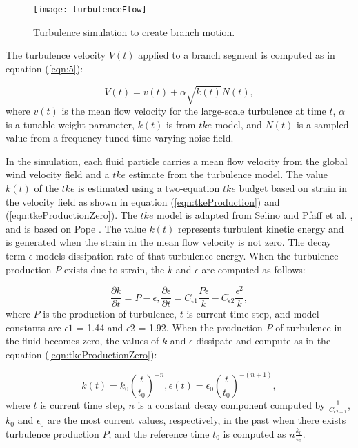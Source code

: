 \begin{figure}[!t]
\centering
\texttt{[image: turbulenceFlow]}
\caption{Turbulence simulation to create branch motion.}
\label{fig:turbulenceFlow}
\end{figure}

The turbulence velocity $V(t)$ applied to a branch segment is computed as in equation (\ref{eqn:5}):

\begin{equation}
\label{eqn:5}
		V(t) = v(t)+ \alpha\sqrt{k(t)}N(t),
\end{equation}
where $v(t)$ is the mean flow velocity for the large-scale turbulence at time $t$, $\alpha$ is a tunable weight parameter, $k(t)$ is from $tke$ model, and $N(t)$ is a sampled value from a frequency-tuned time-varying noise field. 

In the simulation, each fluid particle carries a mean flow velocity from the global wind velocity field and a $tke$ estimate from the turbulence model. The value $k(t)$ of the $tke$ is estimated using a two-equation $tke$ budget based on strain in the velocity field as shown in equation (\ref{eqn:tkeProduction}) and (\ref{eqn:tkeProductionZero}). The $tke$ model is adapted from Selino \cite{Selino:2012} and Pfaff et al. \cite{pfa10}, and is based on Pope \cite{pope2000}. The value $k(t)$ represents turbulent kinetic energy and is generated when the strain in the mean flow velocity is not zero. The decay term $\epsilon$ models dissipation rate of that turbulence energy. When the turbulence production $P$ exists due to strain, the $k$ and $\epsilon$ are computed as follows:

\begin{equation}
\label{eqn:tkeProduction}
		\frac{\partial{k}}{\partial{t}}=P-\epsilon, 
		\frac{\partial{\epsilon}}{\partial{t}}=C_{\epsilon1}\frac{P\epsilon}{k}-C_{\epsilon2}\frac{\epsilon^2}{k},
\end{equation}
where $P$ is the production of turbulence, $t$ is current time step, and model constants are $\epsilon1$ = 1.44 and $\epsilon2$ = 1.92. When the production $P$ of turbulence in the fluid becomes zero, the values of $k$ and $\epsilon$ dissipate and compute as in the equation (\ref{eqn:tkeProductionZero}):

\begin{equation}
\label{eqn:tkeProductionZero}
	k(t) = k_0\left(\frac{t}{t_0}\right)^{-n}, 
	\epsilon(t) = \epsilon_0\left(\frac{t}{t_0}\right)^{-(n+1)},
\end{equation}
where $t$ is current time step, $n$ is a constant decay component computed by $\frac{1}{C_{\epsilon2-1}}$, $k_0$ and $\epsilon_0$ are the most current values, respectively, in the past when there exists turbulence production $P$, and the reference time $t_0$ is computed as $n\frac{k_0}{\epsilon_0}$.

